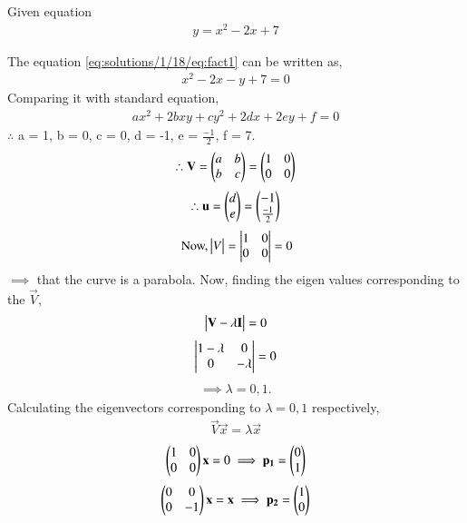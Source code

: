  
	
		Given equation 
		\begin{align} \label{eq:solutions/1/18/eq:fact1}
			y = x^2-2x+7
		\end{align}
	
		The equation \eqref{eq:solutions/1/18/eq:fact1} can be written as,
		\begin{align}
			x^2-2x-y+7 = 0
		\end{align}
		Comparing it with standard equation,
		\begin{align}
			ax^2+2bxy+cy^2+2dx+2ey+f = 0
		\end{align}
		$\therefore$ a = 1, b = 0, c = 0, d = -1, e = $\frac{-1}{2}$, f = 7.
		\begin{align}
			\therefore \mathbf{V} = \begin{pmatrix}a&b\\b&c\end{pmatrix} = \begin{pmatrix}1&0\\0&0\end{pmatrix}
		\end{align} 
		\begin{align}
			\therefore\mathbf{u} = \begin{pmatrix}d\\e\end{pmatrix} = \begin{pmatrix}-1\\\frac{-1}{2}\end{pmatrix}\label{eq:solutions/1/18/eq:eq1}
		\end{align}
		\begin{align}
			\mbox{ Now,} \begin{vmatrix}V\end{vmatrix} = \begin{vmatrix}1&0\\0&0\end{vmatrix} = 0
		\end{align}
		$\implies$ that the curve is a parabola. Now, finding the eigen values corresponding to the $\vec{V}$,
		\begin{align}
			\begin{vmatrix}\mathbf{V}-\lambda\mathbf{I}\end{vmatrix} = 0
		\end{align}
		\begin{align}
			\begin{vmatrix}1-\lambda&0\\0&-\lambda\end{vmatrix} = 0
		\end{align}
		\begin{align}
			\implies \lambda = 0,1.
		\end{align}
		Calculating the eigenvectors corresponding to $\lambda = 0,1$ respectively,
		\begin{align}
			\vec{V}\vec{x} = \lambda\vec{x}
		\end{align}
		\begin{align}
			\begin{pmatrix}1&0\\0&0\end{pmatrix}\mathbf{x} = 0 \implies \mathbf{p_1} = \begin{pmatrix}0\\1\end{pmatrix}
		\end{align}
		\begin{align}
			\begin{pmatrix}0&0\\0&-1\end{pmatrix}\mathbf{x} = \mathbf{x} \implies \mathbf{p_2} = \begin{pmatrix}1\\0\end{pmatrix}
		\end{align}
